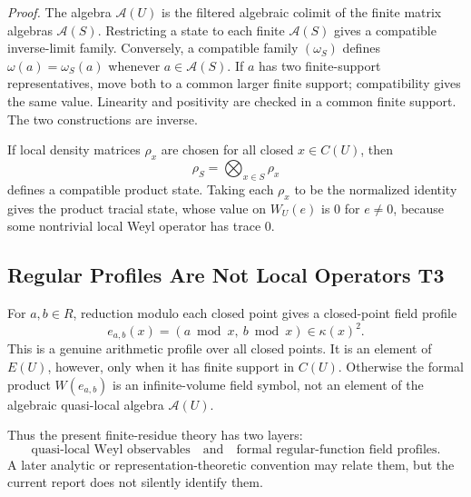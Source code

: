 \emph{Proof.}
The algebra \(\mathcal A(U)\) is the filtered algebraic colimit of the finite
matrix algebras \(\mathcal A(S)\).  Restricting a state to each finite
\(\mathcal A(S)\) gives a compatible inverse-limit family.  Conversely, a
compatible family \((\omega_S)\) defines
\(\omega(a)=\omega_S(a)\) whenever \(a\in\mathcal A(S)\).  If \(a\) has two
finite-support representatives, move both to a common larger finite support;
compatibility gives the same value.  Linearity and positivity are checked in a
common finite support.  The two constructions are inverse.

If local density matrices \(\rho_x\) are chosen for all closed \(x\in C(U)\),
then
\[
  \rho_S=\bigotimes_{x\in S}\rho_x
\]
defines a compatible product state.  Taking each \(\rho_x\) to be the
normalized identity gives the product tracial state, whose value on
\(W_U(e)\) is \(0\) for \(e\ne0\), because some nontrivial local Weyl operator
has trace \(0\).

\subsection{Regular Profiles Are Not Local Operators T3}

For \(a,b\in R\), reduction modulo each closed point gives a closed-point
field profile
\[
  e_{a,b}(x)=(a\bmod x,\ b\bmod x)\in\kappa(x)^2.
\]
This is a genuine arithmetic profile over all closed points.  It is an element
of \(E(U)\), however, only when it has finite support in \(C(U)\).  Otherwise
the formal product \(W(e_{a,b})\) is an infinite-volume field symbol, not an
element of the algebraic quasi-local algebra \(\mathcal A(U)\).

Thus the present finite-residue theory has two layers:
\[
  \text{quasi-local Weyl observables}
  \quad\text{and}\quad
  \text{formal regular-function field profiles}.
\]
A later analytic or representation-theoretic convention may relate them, but
the current report does not silently identify them.
